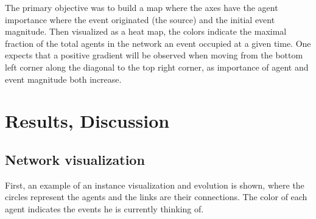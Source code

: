 \documentclass [12pt,a4paper,twoside]{article}
\begin{document}
The primary objective was to build a map where the axes have the agent importance where the event originated (the source) and the initial event magnitude. Then visualized as a heat map, the colors indicate the maximal fraction of the total agents in the network an event occupied at a given time. One expects that a positive gradient will be observed when moving from the bottom left corner along the diagonal to the top right corner, as importance of agent and event magnitude both increase.


\section{Results, Discussion}
\subsection{Network visualization}
First, an example of an instance visualization and evolution is shown, where the circles represent the agents and the links are their connections. The color of each agent indicates the events he is currently thinking of.
\end{document}
